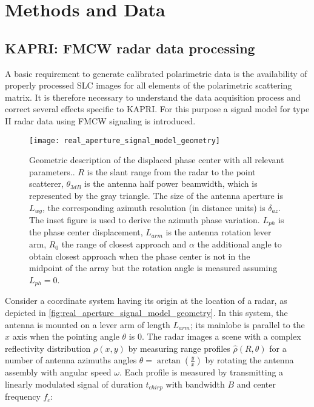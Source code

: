 \section{Methods and Data}\label{sec:methods}
\subsection{KAPRI: FMCW radar data processing}\label{sec:proc_SLC}
A basic requirement to generate calibrated polarimetric data is the availability of properly processed SLC images for all elements of the polarimetric scattering matrix. It is therefore necessary to understand the data acquisition process and correct several effects specific to KAPRI.  
For this purpose a signal model for type II\cite{Caduff2015} radar data using FMCW signaling\cite{Stove1992} is introduced.\\
\begin{figure}[h]
	\centering
	\texttt{[image: real\_aperture\_signal\_model\_geometry]}
	\caption{Geometric description of the displaced phase center with all relevant parameters.. $R$ is the slant range from the radar to the point scatterer, $\theta_{3dB}$ is the antenna half power beamwidth, which is represented by the gray triangle. The size of the antenna aperture is $L_{wg}$, the corresponding azimuth resolution (in distance units) is $\delta_{az}$. The inset figure is used to derive the azimuth phase variation. $L_{ph}$ is the phase center displacement, $L_{arm}$ is the antenna rotation lever arm, $R_{0}$ the range of closest approach and $\alpha$ the additional angle to obtain closest approach when the phase center is not in the midpoint of the array but the rotation angle is measured assuming $L_{ph}=0$.}
	\label{fig:real_aperture_signal_model_geometry}
\end{figure}
Consider a coordinate system having its origin at the location of a radar, as depicted in \autoref{fig:real_aperture_signal_model_geometry}. In this system, the antenna is mounted on a lever arm of length $L_{arm}$; its mainlobe is parallel to the $x$ axis when the pointing angle $\theta$ is 0. The radar images a scene with a complex reflectivity distribution $\rho\left(x,y\right)$ by measuring range profiles $\hat{\rho}\left(R, \theta\right)$ for a number of antenna azimuths angles $\theta = \operatorname{arctan}\left(\frac{y}{x}\right)$ by rotating the antenna assembly with angular speed $\omega$. Each profile is measured by transmitting a linearly modulated signal of duration $t_{chirp}$ with bandwidth $B$ and center frequency $f_c$:
